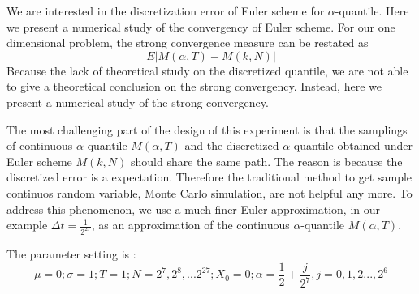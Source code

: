 \documentclass[12pt,oneside,titlepage]{book}
\begin{document}
We are interested in the discretization error of Euler scheme for $\alpha$-quantile. Here we present a numerical study of the convergency of Euler scheme. 
For our one dimensional  problem, the strong convergence measure can be restated as 
\begin{equation}
E|M(\alpha, T)-M(k,N)|
\end{equation}
Because the lack of theoretical study on the discretized quantile, we are not able to give a theoretical conclusion on the strong convergency. Instead, here we present a numerical study of the strong convergency. 

The most challenging part of the design of this experiment is that the samplings of continuous $\alpha$-quantile $M(\alpha, T)$ and the discretized $\alpha$-quantile obtained under Euler scheme $M(k,N)$ should share the same path. The reason is because the discretized error is a expectation. Therefore the traditional method to get sample continuos random variable, Monte Carlo simulation, are not helpful any more. To address this phenomenon, we use a much finer Euler approximation, in our example $\Delta t = \frac{1}{2^{27}}$,  as an approximation of the continuous  $\alpha$-quantile $M(\alpha, T)$. 

The parameter setting is : 
\begin{equation}
\mu = 0 ; \sigma = 1; T=1; N = 2^7 , 2 ^8 , ... 2 ^{27} ; X_0 = 0; \alpha =  \frac{1}{2} + \frac{j}{2^7} , j = 0, 1 , 2..., 2^6
\end{equation}
\end{document}
